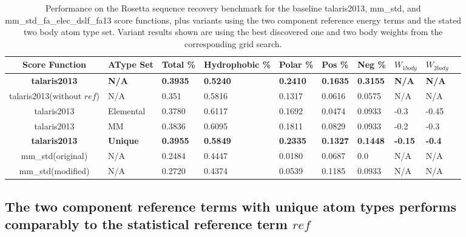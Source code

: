 \begin{table}[!htbp]

\fontsize{9pt}{9pt}
\selectfont

\begin{tabular}{c|lllllllll}
Score Function & AType Set & Total \% & Hydrophobic \% & Polar \% & Pos \% & Neg \% & $W_{1body}$ & $W_{2body}$\\
\hline
\textbf{talaris2013} & \textbf{N/A} & \textbf{0.3935} & \textbf{0.5240} & \textbf{0.2410} & \textbf{0.1635} & \textbf{0.3155} & \textbf{N/A} & \textbf{N/A}\\
talaris2013(without $ref$) & N/A & 0.351 & 0.5816 & 0.1317 & 0.0616 & 0.0575 & N/A & N/A\\
talaris2013 & Elemental & 0.3780 & 0.6117 & 0.1692 & 0.0474 & 0.0933 & -0.3 & -0.45\\
talaris2013 & MM & 0.3836 & 0.6095 & 0.1811 & 0.0829 & 0.0933 & -0.2 & -0.3\\
\textbf{talaris2013} & \textbf{Unique} & \textbf{0.3955} & \textbf{0.5849} & \textbf{0.2335} & \textbf{0.1327} & \textbf{0.1448} & \textbf{-0.15} & \textbf{-0.4}\\
\hline
mm\_std(original) & N/A & 0.2484 & 0.4447 & 0.0180 & 0.0687 & 0.0 & N/A & N/A\\
mm\_std(modified) & N/A & 0.2720 & 0.4374 & 0.0539 & 0.1185 & 0.0933 & N/A & N/A\\

\end{tabular}

\fontsize{10pt}{11pt}
\selectfont
\caption{Performance on the Rosetta sequence recovery benchmark for the baseline talaris2013, mm\_std, and mm\_std\_fa\_elec\_dslf\_fa13 score functions, plus variants using the two component reference energy terms and the stated two body atom type set. 
Variant results shown are using the best discovered one and two body weights from the corresponding grid search.}
\label{tab:performance}

\end{table}


\subsection{The two component reference terms with unique atom types performs comparably to the statistical reference term $ref$}
